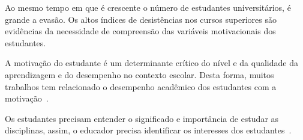 Ao mesmo tempo em que é crescente o número
de estudantes universitários, é grande a
evasão.
Os altos índices de desistências nos cursos
superiores são evidências da necessidade de
compreensão das variáveis motivacionais
dos estudantes.

A motivação do estudante é um determinante crítico 
do  nível  e  da  qualidade  da  aprendizagem
e do desempenho no contexto
escolar.
Desta forma, muitos trabalhos tem relacionado o desempenho
acadêmico dos estudantes com
a motivação~\cite{zenorini2011motivaccao,rufini2011estudo}.

Os estudantes precisam entender o significado e importância
de estudar as disciplinas, assim, o educador
precisa identificar os interesses
dos estudantes~\cite{angeli2011relaccao}.
